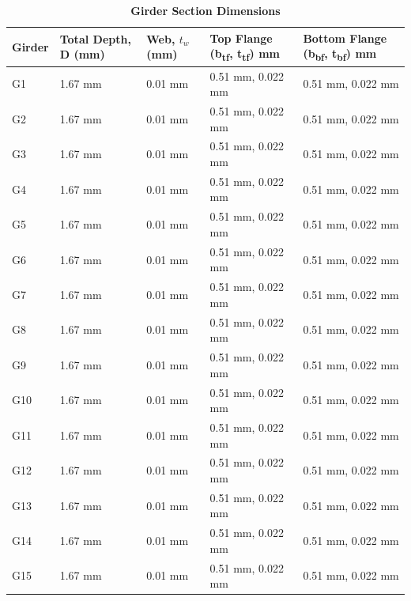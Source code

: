 \documentclass[12pt,a4paper]{report}
\numberwithin{table}{chapter}
\numberwithin{figure}{chapter}
\begin{document}
\vspace{0.6em}

\vspace{4pt}
\begin{longtable}{|L{1.8cm}|L{2.3cm}|L{1.8cm}|p{4.8cm}|p{4.8cm}|}
\caption{\textbf{Girder Section Dimensions}}
\hline
\textbf{Girder} & \textbf{Total Depth, D (mm)} & \textbf{Web, $t_w$ (mm)} & \textbf{Top Flange (b\textsubscript{tf}, t\textsubscript{tf}) mm} & \textbf{Bottom Flange (b\textsubscript{bf}, t\textsubscript{bf}) mm} \\[6pt]
\hline
G1 & 1.67 mm & 0.01 mm & 0.51 mm, 0.022 mm & 0.51 mm, 0.022 mm \\[8pt]
\hline
G2 & 1.67 mm & 0.01 mm & 0.51 mm, 0.022 mm & 0.51 mm, 0.022 mm \\[8pt]
\hline
G3 & 1.67 mm & 0.01 mm & 0.51 mm, 0.022 mm & 0.51 mm, 0.022 mm \\[8pt]
\hline
G4 & 1.67 mm & 0.01 mm & 0.51 mm, 0.022 mm & 0.51 mm, 0.022 mm \\[8pt]
\hline
G5 & 1.67 mm & 0.01 mm & 0.51 mm, 0.022 mm & 0.51 mm, 0.022 mm \\[8pt]
\hline
G6 & 1.67 mm & 0.01 mm & 0.51 mm, 0.022 mm & 0.51 mm, 0.022 mm \\[8pt]
\hline
G7 & 1.67 mm & 0.01 mm & 0.51 mm, 0.022 mm & 0.51 mm, 0.022 mm \\[8pt]
\hline
G8 & 1.67 mm & 0.01 mm & 0.51 mm, 0.022 mm & 0.51 mm, 0.022 mm \\[8pt]
\hline
G9 & 1.67 mm & 0.01 mm & 0.51 mm, 0.022 mm & 0.51 mm, 0.022 mm \\[8pt]
\hline
G10 & 1.67 mm & 0.01 mm & 0.51 mm, 0.022 mm & 0.51 mm, 0.022 mm \\[8pt]
\hline
G11 & 1.67 mm & 0.01 mm & 0.51 mm, 0.022 mm & 0.51 mm, 0.022 mm \\[8pt]
\hline
G12 & 1.67 mm & 0.01 mm & 0.51 mm, 0.022 mm & 0.51 mm, 0.022 mm \\[8pt]
\hline
G13 & 1.67 mm & 0.01 mm & 0.51 mm, 0.022 mm & 0.51 mm, 0.022 mm \\[8pt]
\hline
G14 & 1.67 mm & 0.01 mm & 0.51 mm, 0.022 mm & 0.51 mm, 0.022 mm \\[8pt]
\hline
G15 & 1.67 mm & 0.01 mm & 0.51 mm, 0.022 mm & 0.51 mm, 0.022 mm \\[8pt]
\hline
\end{longtable}

\vspace{0.6em}
\end{document}
